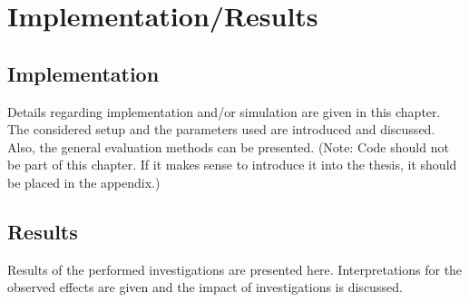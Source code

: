 \chapter{Implementation/Results}
\section{Implementation}
Details regarding implementation and/or simulation are given in this chapter. The considered setup and the parameters used are introduced and discussed. Also, the general evaluation methods can be presented. (Note: Code should not be part of this chapter. If it makes sense to introduce it into the thesis, it should be placed in the appendix.)

\section{Results}
Results of the performed investigations are presented here. Interpretations for the observed effects are given and the impact of investigations is discussed. 
